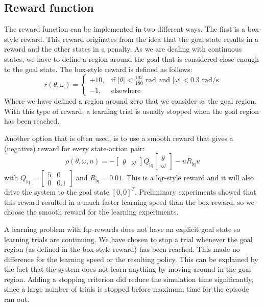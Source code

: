 \subsection{Reward function}\label{sec:PS-learning problem reward}
The reward function can be implemented in two different ways. The first is a box-style reward. This reward originates from the idea that the goal state results in a reward and the other states in a penalty. As we are dealing with continuous states, we have to define a region around the goal that is considered close enough to the goal state. The box-style reward is defined as follows:
$$
	r(\theta,\omega) = 
		\left\{ \begin{array}{ll} 
			+10, & \textrm{if } |\theta|< \frac{10\pi}{180}\textrm{ rad} \textrm{ and } |\omega|< 0.3\textrm{ rad/s} \\  
			-1,  & \textrm{elsewhere} 
		\end{array} \right.
$$
Where we have defined a region around zero that we consider as the goal region. With this type of reward, a learning trial is usually stopped when the goal region has been reached. 

Another option that is often used, is to use a smooth reward that gives a (negative) reward for every state-action pair:
$$
	\rho(\theta,\omega,u) = -\left[ \begin{array}{cc} \theta & \omega \end{array} \right]Q_\textrm{lq}\left[ \begin{array}{c} \theta \\ \omega \end{array} \right]- u R_\textrm{lq} u
$$
with $ Q_\textrm{lq} = \left[ \begin{array}{cc} 5 & 0 \\ 0 & 0.1 \end{array} \right]$ and $R_\textrm{lq} = 0.01$. This is a lqr-style reward and it will also drive the system to the goal state $[0, 0]^T$. Preliminary experiments showed that this reward resulted in a much faster learning speed than the box-reward, so we choose the smooth reward for the learning experiments. %

A learning problem with lqr-rewards does not have an explicit goal state so learning trials are continuing. We have chosen to stop a trial whenever the goal region (as defined in the box-style reward) has been reached. This made no difference for the learning speed or the resulting policy. This can be explained by the fact that the system does not learn anything by moving around in the goal region. Adding a stopping criterion did reduce the simulation time significantly, since a large number of trials is stopped before maximum time for the episode ran out.

